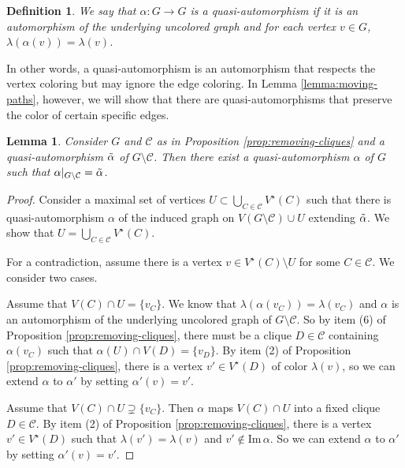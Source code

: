 \documentclass[a4paper, 11pt]{amsart}
\numberwithin{theorem}{section}
\newtheorem{definition}[theorem]{Definition}
\newtheorem{lemma}[theorem]{Lemma}
\newcommand{\cC}{\mathcal{C}}
\begin{document}
\begin{definition}
    We say that $\alpha:G\to G$ is a \emph{quasi-automorphism} if it is an automorphism of the underlying uncolored graph and for each vertex $v\in G$, $\lambda(\alpha(v)) = \lambda(v)$.
\end{definition}

In other words, a quasi-automorphism is an automorphism that respects
the vertex coloring but may ignore the edge coloring.  In Lemma
\ref{lemma:moving-paths}, however, we will show that there are
quasi-automorphisms that preserve the color of certain specific edges.

\begin{lemma}\label{lemma:quasi-automorphism}
    Consider $G$ and $\mathcal{C}$ as in Proposition \ref{prop:removing-cliques} and a quasi-automorphism $\Tilde{\alpha}$ of $G\setminus\mathcal{C}$. Then there exist a quasi-automorphism $\alpha$ of $G$ such that $\alpha\vert_{G\setminus\mathcal{C}} = \Tilde{\alpha}$.
\end{lemma}
\begin{proof}
    Consider a maximal set of vertices $U\subset \bigcup_{C \in \cC}
    V^\star(C)$ such that there is quasi-automorphism $\alpha$ of the
    induced graph on $V(G\setminus \mathcal{C})\cup U$ extending
    $\Tilde{\alpha}$. We show that $U = \bigcup _{C \in \cC}
    V^\star(C)$. 

    For a contradiction, assume there is a vertex $v\in
    V^\star(C)\setminus U$ for some $C \in \cC$. We consider two cases.

    Assume that $V(C)\cap U = \lbrace v_C\rbrace$. We know that
    $\lambda(\alpha(v_C)) = \lambda(v_C)$ and $\alpha$ is an
    automorphism of the underlying uncolored graph of $G \setminus
    \cC$. So by item (6) of Proposition \ref{prop:removing-cliques},
    there must be a clique $D\in \mathcal C$ containing $\alpha(v_C)$
    such that $\alpha(U)\cap V(D) = \lbrace v_D\rbrace$. By item (2)
    of Proposition \ref{prop:removing-cliques}, there is a vertex $v'
    \in V^\star(D)$ of color $\lambda(v)$, so we can extend $\alpha$ to $\alpha'$ by setting $\alpha'(v) = v'$.

    Assume that $V(C)\cap U \supsetneq \lbrace v_C\rbrace$. Then
    $\alpha$ maps $V(C)\cap U$ into a fixed clique $D\in \mathcal{C}$. By
    item (2) of Proposition \ref{prop:removing-cliques}, there is a
    vertex $v' \in V^\star(D)$ such that $\lambda(v') = \lambda(v)$ and $v'\not\in \text{Im}\,\alpha$. So we can extend $\alpha$ to $\alpha'$ by setting $\alpha'(v) = v'$.
\end{proof}
\end{document}
